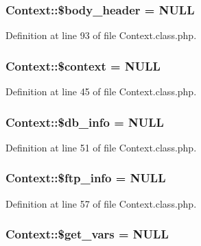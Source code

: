 \subsubsection[{\$body\+\_\+header}]{\setlength{\rightskip}{0pt plus 5cm}Context\+::\$body\+\_\+header = N\+U\+L\+L}\label{classContext_aa2c90f49a1f6389eadea8962d0fbf5b3}


Definition at line 93 of file Context.\+class.\+php.

\hypertarget{classContext_a39e9103dacbca5e5fa49d6e93f0ccec3}{}
\subsubsection[{\$context}]{\setlength{\rightskip}{0pt plus 5cm}Context\+::\$context = N\+U\+L\+L}\label{classContext_a39e9103dacbca5e5fa49d6e93f0ccec3}


Definition at line 45 of file Context.\+class.\+php.

\hypertarget{classContext_a6f4d307bdcb4bfd83fda27bc265977eb}{}
\subsubsection[{\$db\+\_\+info}]{\setlength{\rightskip}{0pt plus 5cm}Context\+::\$db\+\_\+info = N\+U\+L\+L}\label{classContext_a6f4d307bdcb4bfd83fda27bc265977eb}


Definition at line 51 of file Context.\+class.\+php.

\hypertarget{classContext_a8b9cb334c451f773d75db73b01f86ccc}{}
\subsubsection[{\$ftp\+\_\+info}]{\setlength{\rightskip}{0pt plus 5cm}Context\+::\$ftp\+\_\+info = N\+U\+L\+L}\label{classContext_a8b9cb334c451f773d75db73b01f86ccc}


Definition at line 57 of file Context.\+class.\+php.

\hypertarget{classContext_a587652913f4784dc8ad4a1cd4e3ee408}{}
\subsubsection[{\$get\+\_\+vars}]{\setlength{\rightskip}{0pt plus 5cm}Context\+::\$get\+\_\+vars = N\+U\+L\+L}\label{classContext_a587652913f4784dc8ad4a1cd4e3ee408}


